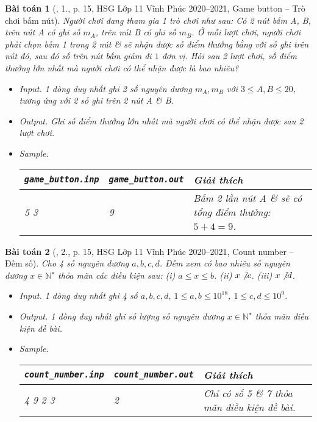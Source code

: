\documentclass{article}
\newtheorem{baitoan}{Bài toán}
\DeclareRobustCommand{\divby}{%
	\mathrel{\vbox{\baselineskip.65ex\lineskiplimit0pt\hbox{.}\hbox{.}\hbox{.}}}%
}
\begin{document}
\begin{baitoan}[\cite{Trung_HSG_THPT_Tin}, 1., p. 15, HSG Lớp 11 Vĩnh Phúc 2020--2021, Game button -- Trò chơi bấm nút]
	Người chơi đang tham gia 1 trò chơi như sau: Có 2 nút bấm A, B, trên nút A có ghi số $m_A$, trên nút B có ghi số $m_B$. Ở mỗi lượt chơi, người chơi phải chọn bấm 1 trong 2 nút \& sẽ nhận được số điểm thưởng bằng với số ghi trên nút đó, sau đó số trên nút bấm giảm đi $1$ đơn vị. Hỏi sau 2 lượt chơi, số điểm thưởng lớn nhất mà người chơi có thể nhận được là bao nhiêu?
	\begin{itemize}
		\item {\sf Input.} 1 dòng duy nhất ghi 2 số nguyên dương $m_A,m_B$ với $3\le A,B\le20$, tương ứng với 2 số ghi trên 2 nút A \& B.
		\item {\sf Output.} Ghi số điểm thưởng lớn nhất mà người chơi có thể nhận được sau 2 lượt chơi.
		\item {\sf Sample.}
		\begin{table}[H]
			\centering
			\begin{tabular}{|l|l|l|}
				\hline
				\verb|game_button.inp| & \verb|game_button.out| & Giải thích\\
				\hline
				5 3 & 9 & Bấm 2 lần nút A \& sẽ có tổng điểm thưởng: $5 + 4 = 9$. \\
				\hline
			\end{tabular}
		\end{table}
	\end{itemize}
\end{baitoan}

\begin{baitoan}[\cite{Trung_HSG_THPT_Tin}, 2., p. 15, HSG Lớp 11 Vĩnh Phúc 2020--2021, Count number -- Đếm số]
	Cho 4 số nguyên dương $a,b,c,d$. Đếm xem có bao nhiêu số nguyên dương $x\in\mathbb{N}^\star$ thỏa mãn các điều kiện sau: (i) $a\le x\le b$. (ii) $x\not{\divby}c$. (iii) $x\not{\divby}d$.
	\begin{itemize}
		\item {\sf Input.} 1 dòng duy nhất ghi 4 số $a,b,c,d$, $1\le a,b\le10^{18}$, $1\le c,d\le10^9$.
		\item {\sf Output.} 1 dòng duy nhất ghi số lượng số nguyên dương $x\in\mathbb{N}^\star$ thỏa mãn điều kiện đề bài.
		\item {\sf Sample.}
		\begin{table}[H]
			\centering
			\begin{tabular}{|l|l|l|}
				\hline
				\verb|count_number.inp| & \verb|count_number.out| & Giải thích \\
				\hline
				4 9 2 3 & 2 & Chỉ có số 5 \& 7 thỏa mãn điều kiện đề bài. \\
				\hline
			\end{tabular}
		\end{table}
	\end{itemize}
\end{baitoan}
\end{document}
